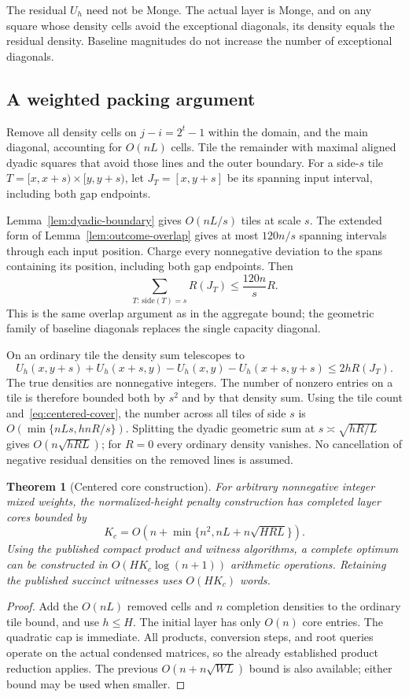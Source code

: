 \documentclass[11pt]{article}
\newtheorem{theorem}{Theorem}
\begin{document}
The residual $U_h$ need not be Monge. The actual layer is Monge, and on
any square whose density cells avoid the exceptional diagonals, its density
equals the residual density. Baseline magnitudes do not increase the number
of exceptional diagonals.

\subsection{A weighted packing argument}\label{sec:weighted-packing}
Remove all density cells on $j-i=2^t-1$ within the domain, and the main
diagonal, accounting for $O(nL)$ cells. Tile the remainder with maximal
aligned dyadic squares that avoid those lines and the outer boundary.
For a side-$s$ tile $T=[x,x+s)\times[y,y+s)$, let
$J_T=[x,y+s]$ be its spanning input interval, including both gap endpoints.

Lemma~\ref{lem:dyadic-boundary} gives $O(nL/s)$ tiles at scale $s$.
The extended form of Lemma~\ref{lem:outcome-overlap} gives at most
$120n/s$ spanning intervals through each input position. Charge every
nonnegative deviation to the spans containing its position, including both
gap endpoints. Then
\begin{equation}\label{eq:centered-cover}
 \sum_{T:\,\mathrm{side}(T)=s}R(J_T)\le\frac{120n}{s}R.
\end{equation}
This is the same overlap argument as in the aggregate bound; the geometric
family of baseline diagonals replaces the single capacity diagonal.

On an ordinary tile the density sum telescopes to
\[
 U_h(x,y+s)+U_h(x+s,y)-U_h(x,y)-U_h(x+s,y+s)
 \le 2hR(J_T).
\]
The true densities are nonnegative integers. The number of nonzero entries
on a tile is therefore bounded both by $s^2$ and by that density sum.
Using the tile count and~\eqref{eq:centered-cover}, the number across all
tiles of side $s$ is $O(\min\{nLs,hnR/s\})$. Splitting the dyadic geometric
sum at $s\asymp\sqrt{hR/L}$ gives $O(n\sqrt{hRL})$; for $R=0$ every
ordinary density vanishes. No cancellation of negative residual densities
on the removed lines is assumed.

\begin{theorem}[Centered core construction]\label{thm:centered-core}
For arbitrary nonnegative integer mixed weights, the normalized-height
penalty construction has completed layer cores bounded by
\[
 K_c=O\!\left(n+\min\{n^2,nL+n\sqrt{HRL}\}\right).
\]
Using the published compact product and witness algorithms, a complete
optimum can be constructed in $O(HK_c\log(n+1))$ arithmetic operations.
Retaining the published succinct witnesses uses $O(HK_c)$ words.
\end{theorem}
\begin{proof}
Add the $O(nL)$ removed cells and $n$ completion densities to the ordinary
tile bound, and use $h\le H$. The initial layer has only $O(n)$ core entries.
The quadratic cap is immediate. All products, conversion steps, and root
queries operate on the actual condensed matrices, so the already established
product reduction applies. The previous $O(n+n\sqrt{WL})$ bound is also
available; either bound may be used when smaller.
\end{proof}
\end{document}
